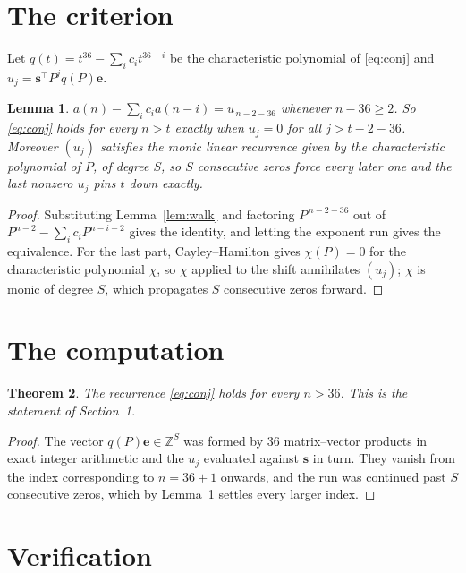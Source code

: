 \documentclass[11pt,a4paper]{article}
\theoremstyle{plain}
\newtheorem{theorem}{Theorem}
\newtheorem{lemma}[theorem]{Lemma}
\theoremstyle{definition}
\begin{document}
\section{The criterion}

Let $q(t)=t^{36}-\sum_i c_i t^{36-i}$ be the characteristic polynomial of
\eqref{eq:conj} and $u_j=\mathbf{s}^{\!\top}P^{j}q(P)\mathbf{e}$.

\begin{lemma}\label{lem:crit}
$a(n)-\sum_i c_i a(n-i)=u_{\,n-2-36}$ whenever $n-36\ge2$. So \eqref{eq:conj}
holds for every $n>t$ exactly when $u_j=0$ for all $j>t-2-36$. Moreover $(u_j)$
satisfies the monic linear recurrence given by the characteristic polynomial of $P$, of
degree $S$, so $S$ consecutive zeros force every later one and the last nonzero $u_j$ pins
$t$ down exactly.
\end{lemma}

\begin{proof}
Substituting Lemma~\ref{lem:walk} and factoring $P^{\,n-2-36}$ out of
$P^{n-2}-\sum_i c_i P^{n-i-2}$ gives the identity, and letting the exponent run gives the
equivalence. For the last part, Cayley--Hamilton gives $\chi(P)=0$ for the characteristic
polynomial $\chi$, so $\chi$ applied to the shift annihilates $(u_j)$; $\chi$ is monic of
degree $S$, which propagates $S$ consecutive zeros forward.
\end{proof}

\section{The computation}

\begin{theorem}
The recurrence \eqref{eq:conj} holds for every $n>36$. This is the statement of
Section~1.
\end{theorem}

\begin{proof}
The vector $q(P)\mathbf{e}\in\mathbb{Z}^{S}$ was formed by $36$ matrix--vector
products in exact integer arithmetic and the $u_j$ evaluated against $\mathbf{s}$ in turn.
They vanish from the index corresponding to $n=36+1$ onwards, and the run was continued
past $S$ consecutive zeros, which by Lemma~\ref{lem:crit} settles every larger index.
\end{proof}

\section{Verification}
\end{document}
